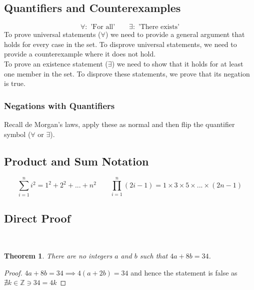 \documentclass[a4paper,twoside,10pt]{article}
\newenvironment{examquestion}[1]{%
	\mbox{}\\\tcolorbox[beamer,breakable,%
	title=Exam-style Question: #1,standard jigsaw,opacityback=0, colframe=red!75!black, boxrule=2pt]}{\endtcolorbox\mbox{}\\}
\newtheorem*{theorem*}{Theorem}
\begin{document}
		\subsection{Quantifiers and Counterexamples}
			\[
				\forall:\text{ 'For all'} \qquad \exists:\text{ 'There exists'}
			\]
			To prove universal statements ($\forall$) we need to provide a general argument that holds for every case in the set. To disprove universal statements, we need to provide a counterexample where it does not hold.\\
			To prove an existence statement ($\exists$) we need to show that it holds for at least one member in the set. To disprove these statements, we prove that its negation is true.
			\subsubsection{Negations with Quantifiers}
				Recall de Morgan's laws, apply these as normal and then flip the quantifier symbol ($\forall$ or $\exists$).
		\subsection{Product and Sum Notation}
			\[
				\sum_{i=1}^ni^2=1^2+2^2+...+n^2 \qquad \prod_{i=1}^n(2i-1)=1\times3\times5\times...\times(2n-1)
			\]
		\subsection{Direct Proof}
			\begin{examquestion}{1000 Spesh Questions Doc Proof 3}
				\begin{theorem*}
					There are no integers $a$ and $b$ such that $4a+8b=34$.
				\end{theorem*}
				\begin{proof}
					$4a+8b=34\implies 4(a+2b)=34$ and hence the statement is false as $\nexists k\in\mathbb{Z}\ni 34=4k$
				\end{proof}
			\end{examquestion}
\end{document}
